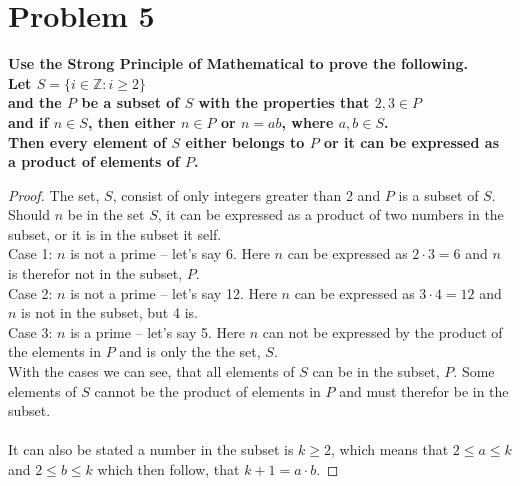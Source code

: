 \documentclass[english,11pt,a4paper]{article}
\begin{document}
\section*{Problem 5}
\textbf{Use the Strong Principle of Mathematical to prove the following.\\
Let $S= \{ i \in \mathbb{Z} : i \geq 2\}$ \\
and the $P$ be a subset of $S$ with the properties that $2,3 \in P$ \\
and if $n \in S$, then either $n \in P$ or $n=ab$, where $a,b\in S$. \\
Then every element of $S$ either belongs to $P$ or it can be expressed as a product of elements of $P$.}
\begin{proof}
The set, $S$, consist of only integers greater than 2 and $P$ is a subset of $S$.
Should $n$ be in the set $S$, it can be expressed as a product of two numbers in the subset, or it is in the subset it self.
\\
Case 1: $n$ is not a prime -- let's say 6. Here $n$ can be expressed as $2 \cdot 3 = 6$ and $n$ is therefor not in the subset, $P$.
\\
Case 2: $n$ is not a prime -- let's say 12. Here $n$ can be expressed as $3 \cdot 4 = 12$ and $n$ is not in the subset, but 4 is.
\\
Case 3: $n$ is a prime -- let's say 5. Here $n$ can not be expressed by the product of the elements in $P$ and is only the the set, $S$.
\\
With the cases we can see, that all elements of $S$ can be in the subset, $P$. 
Some elements of $S$ cannot be the product of elements in $P$ and must therefor be in the subset.
\\
\\
It can also be stated a number in the subset is $k \geq 2$, which means that $2 \leq a \leq k$ and $2 \leq b \leq k$ which then follow, that $k+1=a\cdot b$.
\end{proof}
\end{document}
